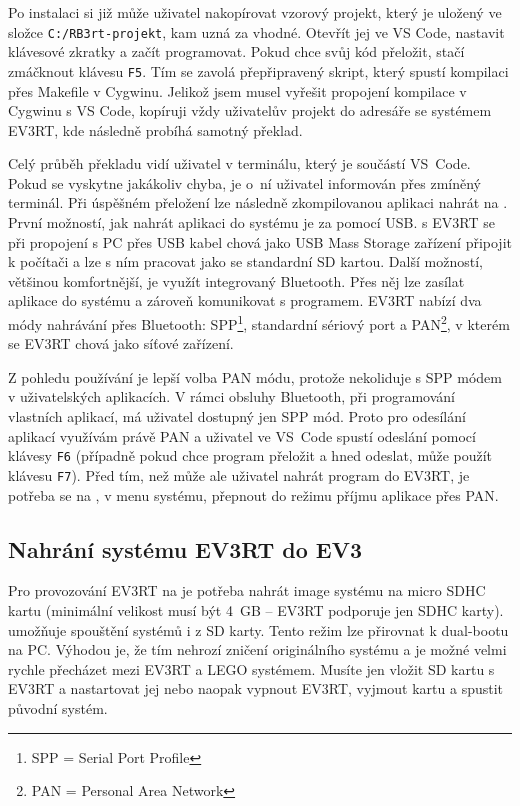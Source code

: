 Po instalaci si již může uživatel nakopírovat vzorový projekt, který je uložený ve složce \texttt{C:/RB3rt-projekt}, kam uzná za vhodné. 
Otevřít jej ve VS Code, nastavit klávesové zkratky a začít programovat.
Pokud chce svůj kód přeložit, stačí zmáčknout klávesu \texttt{F5}. 
Tím se zavolá přepřipravený skript, který spustí kompilaci přes Makefile v Cygwinu. 
Jelikož jsem musel vyřešit propojení kompilace v Cygwinu s VS Code, kopíruji vždy uživatelův projekt do adresáře se systémem EV3RT, kde následně probíhá samotný překlad.

Celý průběh překladu vidí uživatel v  terminálu, který je součástí VS~Code. 
Pokud se vyskytne jakákoliv chyba, je o~ní uživatel informován přes zmíněný terminál.
Při úspěšném přeložení lze následně zkompilovanou aplikaci nahrát na \EVbrick{}. 
První možností, jak nahrát aplikaci do systému je za pomocí USB. \brick{} s EV3RT se při propojení s PC přes USB kabel chová jako USB Mass Storage zařízení připojit k počítači a lze s ním pracovat jako se standardní SD kartou.
Další možností, většinou komfortnější, je využít integrovaný Bluetooth. 
Přes něj lze zasílat aplikace do systému a zároveň komunikovat s programem. 
EV3RT nabízí dva módy nahrávání přes Bluetooth: SPP\footnote{SPP = Serial Port Profile}, standardní sériový port a PAN\footnote{PAN = Personal Area Network}, v kterém se EV3RT chová jako síťové zařízení.

Z pohledu používání je lepší volba PAN módu, protože nekoliduje s SPP módem v uživatelských aplikacích. 
V rámci obsluhy Bluetooth, při programování vlastních aplikací, má uživatel dostupný jen SPP mód.
Proto pro odesílání aplikací využívám právě PAN a uživatel ve VS~Code spustí odeslání  pomocí klávesy \texttt{F6} (případně pokud chce program přeložit a hned odeslat, může použít klávesu \texttt{F7}).
Před tím, než může ale uživatel nahrát program do EV3RT, je potřeba se na , v menu systému, přepnout do režimu příjmu aplikace přes PAN.

\subsection{Nahrání systému EV3RT do EV3}

Pro provozování EV3RT na  je potřeba nahrát image systému na micro SDHC kartu (minimální velikost musí být 4~GB -- EV3RT podporuje jen SDHC karty).
\EVbrick{} umožňuje spouštění systémů i z SD karty. Tento režim lze přirovnat k dual-bootu na PC. 
Výhodou je, že tím nehrozí zničení originálního systému a je možné velmi rychle přecházet mezi EV3RT a LEGO systémem. 
Musíte jen vložit SD kartu s EV3RT a nastartovat jej nebo naopak vypnout EV3RT, vyjmout kartu a spustit původní systém.

